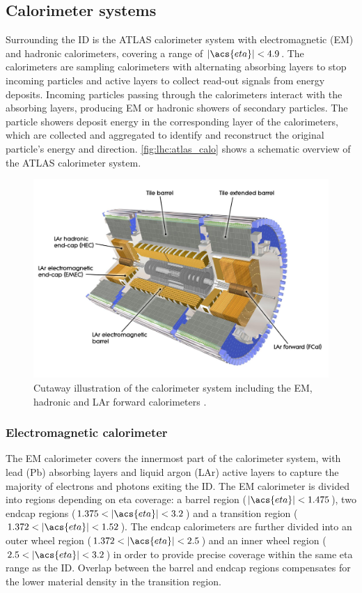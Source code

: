 \documentclass[../thesis.tex]{subfiles}
\begin{document}
\subsection{Calorimeter systems}
Surrounding the \acs{ID} is the ATLAS calorimeter system \citep{atlas} with electromagnetic (\acs{EM}) and hadronic calorimeters, covering a range of $|\acs{eta}|<4.9$. The calorimeters are sampling calorimeters with alternating absorbing layers to stop incoming particles and active layers to collect read-out signals from energy deposits. Incoming particles passing through the calorimeters interact with the absorbing layers, producing \acs{EM} or hadronic showers of secondary particles. The particle showers deposit energy in the corresponding layer of the calorimeters, which are collected and aggregated to identify and reconstruct the original particle's energy and direction. \autoref{fig:lhc:atlas_calo} shows a schematic overview of the ATLAS calorimeter system.

\begin{figure}[!htb]
\begin{center}
\includegraphics[width=0.7\linewidth]{fig/lhc_atlas_calorimeter.jpg}
\caption[Cutaway illustration of the calorimeter system including the \acs{EM}, hadronic and \acs{LAr} forward calorimeters ]{\label{fig:lhc:atlas_calo}Cutaway illustration of the calorimeter system including the \acs{EM}, hadronic and \acs{LAr} forward calorimeters \citep{lhc:atlas_calo}.}
\end{center}
\end{figure}

\subsubsection*{Electromagnetic calorimeter} 
The \acs{EM} calorimeter \citep{atlas} covers the innermost part of the calorimeter system, with lead (Pb) absorbing layers and liquid argon (\acs{LAr}) active layers to capture the majority of electrons and photons exiting the \acs{ID}. The \acs{EM} calorimeter is divided into regions depending on \acs{eta} coverage: a barrel region ($|\acs{eta}|<1.475$), two endcap regions ($1.375<|\acs{eta}|<3.2$) and a transition region ($1.372<|\acs{eta}|<1.52$). The endcap calorimeters are further divided into an outer wheel region ($1.372<|\acs{eta}|<2.5$) and an inner wheel region ($2.5<|\acs{eta}|<3.2$) in order to provide precise coverage within the same \acs{eta} range as the \acs{ID}. Overlap between the barrel and endcap regions compensates for the lower material density in the transition region.
\end{document}
